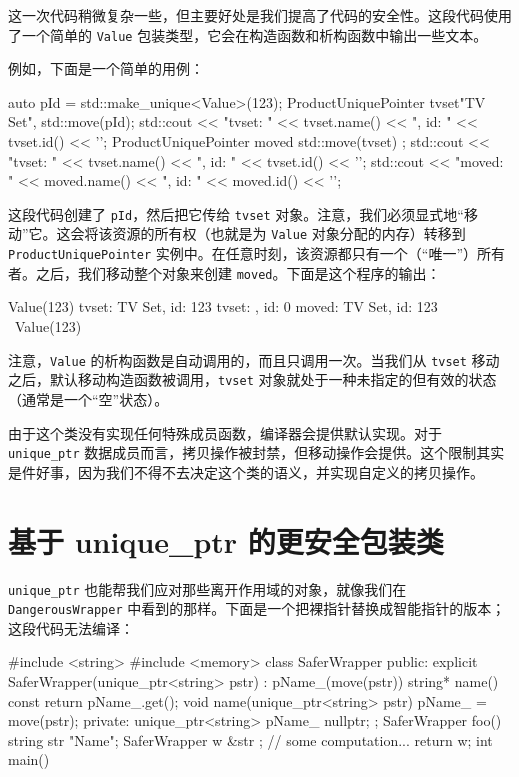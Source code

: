 这一次代码稍微复杂一些，但主要好处是我们提高了代码的安全性。这段代码使用了一个简单的 \texttt{Value} 包装类型，它会在构造函数和析构函数中输出一些文本。

例如，下面是一个简单的用例：

\begin{codebox}[cpp]
auto pId = std::make_unique<Value>(123);
ProductUniquePointer tvset{"TV Set", std::move(pId)};
std::cout << "tvset: " << tvset.name() << ", id: " << tvset.id() << '\n';
ProductUniquePointer moved { std::move(tvset) };
std::cout << "tvset: " << tvset.name() << ", id: " << tvset.id() << '\n';
std::cout << "moved:
" << moved.name() << ", id: " << moved.id() << '\n';
\end{codebox}

这段代码创建了 \texttt{pId}，然后把它传给 \texttt{tvset} 对象。注意，我们必须显式地“移动”它。这会将该资源的所有权（也就是为 \texttt{Value} 对象分配的内存）转移到 \texttt{ProductUniquePointer} 实例中。在任意时刻，该资源都只有一个（“唯一”）所有者。之后，我们移动整个对象来创建 \texttt{moved}。下面是这个程序的输出：

\begin{codebox}[cpp]
Value(123)
tvset: TV Set, id: 123
tvset: , id: 0
moved:
TV Set, id: 123
~Value(123)
\end{codebox}

注意，\texttt{Value} 的析构函数是自动调用的，而且只调用一次。当我们从 \texttt{tvset} 移动之后，默认移动构造函数被调用，\texttt{tvset} 对象就处于一种未指定的但有效的状态（通常是一个“空”状态）。

由于这个类没有实现任何特殊成员函数，编译器会提供默认实现。对于 \texttt{unique\_ptr} 数据成员而言，拷贝操作被封禁，但移动操作会提供。这个限制其实是件好事，因为我们不得不去决定这个类的语义，并实现自定义的拷贝操作。

\section{基于 unique\_ptr 的更安全包装类}

\texttt{unique\_ptr} 也能帮我们应对那些离开作用域的对象，就像我们在 \texttt{DangerousWrapper} 中看到的那样。下面是一个把裸指针替换成智能指针的版本；这段代码无法编译：

\begin{codebox}[cpp]
#include <string>
#include <memory>
class SaferWrapper {
public:
explicit SaferWrapper(unique_ptr<string> pstr)
: pName_(move(pstr)) { }
string* name() const { return pName_.get(); }
void name(unique_ptr<string> pstr) { pName_ = move(pstr); }
private:
unique_ptr<string> pName_ {nullptr};
};
SaferWrapper foo() {
string str { "Name"};
SaferWrapper w { &str };
// some computation...
return w;
}
int main() { }
\end{codebox}

